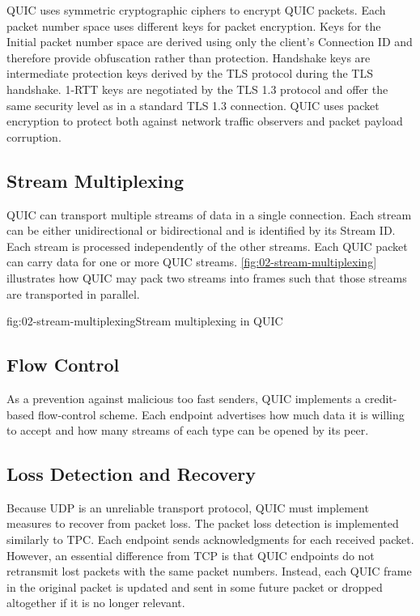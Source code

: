 QUIC uses symmetric cryptographic ciphers to encrypt QUIC packets. Each packet number space uses
different keys for packet encryption. Keys for the Initial packet number space are derived using
only the client's Connection ID and therefore provide obfuscation rather than protection. Handshake
keys are intermediate protection keys derived by the TLS protocol during the TLS handshake. 1-RTT
keys are negotiated by the TLS 1.3 protocol and offer the same security level as in a standard TLS
1.3 connection. QUIC uses packet encryption to protect both against network traffic observers and
packet payload corruption.

\subsection{Stream Multiplexing}

QUIC can transport multiple streams of data in a single connection. Each stream can be either
unidirectional or bidirectional and is identified by its Stream ID. Each stream is processed
independently of the other streams. Each QUIC packet can carry data for one or more QUIC streams.
\autoref{fig:02-stream-multiplexing} illustrates how QUIC may pack two streams into frames such that
those streams are transported in parallel.

\begin{myFigure}{fig:02-stream-multiplexing}{Stream multiplexing in QUIC}

  

\end{myFigure}

\subsection{Flow Control}

As a prevention against malicious too fast senders, QUIC implements a credit-based flow-control
scheme. Each endpoint advertises how much data it is willing to accept and how many streams of each
type can be opened by its peer.

\subsection{Loss Detection and Recovery}

Because UDP is an unreliable transport protocol, QUIC must implement measures to recover from packet
loss. The packet loss detection is implemented similarly to TPC. Each endpoint sends acknowledgments
for each received packet. However, an essential difference from TCP is that QUIC endpoints do not
retransmit lost packets with the same packet numbers. Instead, each QUIC frame in the original
packet is updated and sent in some future packet or dropped altogether if it is no longer relevant.

